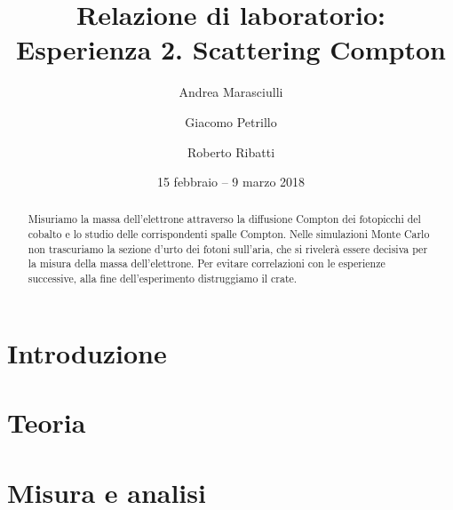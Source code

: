 \documentclass[a4paper]{article}
\title{Relazione di laboratorio:\\
Esperienza 2. Scattering Compton}
\author{Andrea Marasciulli
\and Giacomo Petrillo
\and Roberto Ribatti}
\date{15 febbraio -- 9 marzo 2018}
\begin{document}
\maketitle

\begin{abstract}
	Misuriamo la massa dell'elettrone attraverso la diffusione Compton dei fotopicchi del cobalto e lo studio delle corrispondenti spalle Compton. Nelle simulazioni Monte Carlo non trascuriamo la sezione d'urto dei fotoni sull'aria, che si rivelerà essere decisiva per la misura della massa dell'elettrone.
	Per evitare correlazioni con le esperienze successive, alla fine dell'esperimento distruggiamo il crate.
\end{abstract}

{\small \tableofcontents}

\newpage
\section{Introduzione}

%



\section{Teoria}





\section{Misura e analisi}









%
\end{document}
